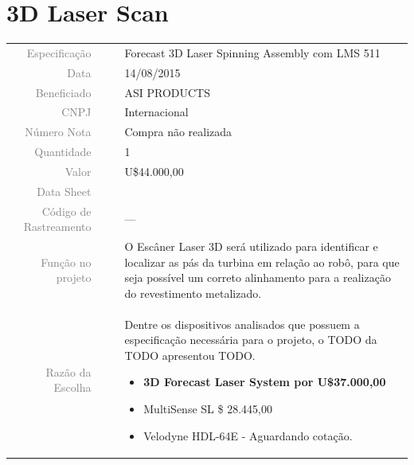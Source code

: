 \documentclass{article}
\begin{document}
\section*{3D Laser Scan}
\label{sonar}


\begin{table}[ht!]

	\begin{tabular}{r l l p{12cm} }
		
		\textcolor{gray}{Especificação} &&& 	{Forecast 3D Laser Spinning Assembly
		com LMS 511}\\
		\textcolor{gray}{Data} &&& 				{14/08/2015}\\
        \textcolor{gray}{Beneficiado} &&&		{ASI PRODUCTS} \\
        \textcolor{gray}{CNPJ} &&& 				{Internacional} \\
        \textcolor{gray}{Número Nota} &&& 		{Compra não realizada} \\
		\textcolor{gray}{Quantidade} &&& 		{1} \\
		\textcolor{gray}{Valor} &&& 			{U\$44.000,00} \\
		\textcolor{gray}{Data Sheet} &&& 		{} \\
		\textcolor{gray}{Código de Rastreamento} &&& {---} \\

		\textcolor{gray}{Função no projeto} &&& {O Escâner Laser 3D será utilizado
		para identificar e localizar as pás da turbina em relação ao robô, para que
		seja possível um correto alinhamento para a realização do revestimento
		metalizado.} \\
		\textcolor{gray}{Razão da Escolha} &&& {Dentre os dispositivos analisados que
		possuem a especificação necessária para o projeto, o TODO da
		TODO apresentou TODO.
		 \begin{itemize}
		  \item \textbf {3D Forecast Laser System por U\$37.000,00}
		  \item MultiSense SL \$ 28.445,00 
		  \item Velodyne HDL-64E - Aguardando cotação.
		\end{itemize}}

	\end{tabular}
\end{table}
\end{document}
